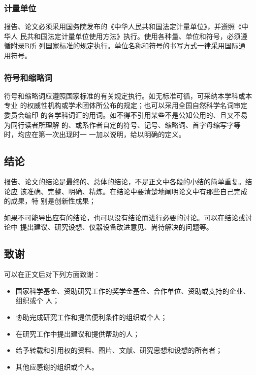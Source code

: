 \documentclass[master]{njuthesis}
\begin{document}
\subsubsection{计量单位}

报告、论文必须采用国务院发布的《中华人民共和国法定计量单位》，并遵照《中华人
民共和国法定计量单位使用方法》执行。使用各种量、单位和符号，必须遵循附录B所
列国家标准的规定执行。单位名称和符号的书写方式一律采用国际通用符号。

\subsubsection{符号和缩略词}

符号和缩略词应遵照国家标准的有关规定执行。如无标准可循，可采纳本学科或本专业
的权威性机构或学术团体所公布的规定；也可以采用全国自然科学名词审定委员会编印
的各学科词汇的用词。如不得不引用某些不是公知公用的、且又不易为同行读者所理解
的、或系作者自定的符号、记号、缩略词、首字母缩写字等时，均应在第一次出现时一
一加以说明，给以明确的定义。

\subsection{结论}

报告、论文的结论是最终的、总体的结论，不是正文中各段的小结的简单重复。结论应
该准确、完整、明确、精炼。在结论中要清楚地阐明论文中有那些自己完成的成果，特
别是创新性成果；

如果不可能导出应有的结论，也可以没有结论而进行必要的讨论。可以在结论或讨论中
提出建议、研究设想、仪器设备改进意见、尚待解决的问题等。

\subsection{致谢}

可以在正文后对下列方面致谢：

\begin{itemize}
\item 国家科学基金、资助研究工作的奖学金基金、合作单位、资助或支持的企业、组织或个
人；
\item 协助完成研究工作和提供便利条件的组织或个人；
\item 在研究工作中提出建议和提供帮助的人；
\item 给予转载和引用权的资料、图片、文献、研究思想和设想的所有者；
\item 其他应感谢的组织或个人。
\end{itemize}
\end{document}
